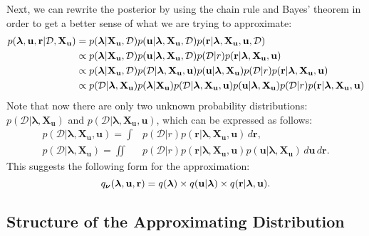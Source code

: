 \documentclass{mprop}
\theoremstyle{definition}
\begin{document}
Next, we can rewrite the posterior by using the chain rule and Bayes' theorem in
order to get a better sense of what we are trying to approximate:
\[
  \begin{split}
    p(\bm\lambda, \mathbf{u}, \mathbf{r} | \mathcal{D}, \mathbf{X_u}) &= p(\bm\lambda | \mathbf{X_u}, \mathcal{D}) p(\mathbf{u}
    | \bm\lambda, \mathbf{X_u}, \mathcal{D}) p(\mathbf{r} | \bm\lambda,
    \mathbf{X_u}, \mathbf{u}, \mathcal{D}) \\
    &\propto p(\bm\lambda | \mathbf{X_u}, \mathcal{D}) p(\mathbf{u} |
    \bm\lambda, \mathbf{X_u}, \mathcal{D}) p(\mathcal{D} | r)
    p(\mathbf{r} | \bm\lambda, \mathbf{X_u}, \mathbf{u}) \\
    &\propto p(\bm\lambda | \mathbf{X_u}, \mathcal{D}) p(\mathcal{D} |
    \bm\lambda, \mathbf{X_u}, \mathbf{u}) p(\mathbf{u} | \bm\lambda,
    \mathbf{X_u}) p(\mathcal{D} | r) p(\mathbf{r} | \bm\lambda,
    \mathbf{X_u}, \mathbf{u}) \\
    &\propto p(\mathcal{D} | \bm\lambda, \mathbf{X_u}) p(\bm\lambda |
    \mathbf{X_u}) p(\mathcal{D} | \bm\lambda, \mathbf{X_u}, \mathbf{u})
    p(\mathbf{u} | \bm\lambda, \mathbf{X_u}) p(\mathcal{D} | r)
    p(\mathbf{r} | \bm\lambda, \mathbf{X_u}, \mathbf{u})
  \end{split}
\]
Note that now there are only two unknown probability distributions:
$p(\mathcal{D} | \bm\lambda, \mathbf{X_u})$ and $p(\mathcal{D} | \bm\lambda,
\mathbf{X_u}, \mathbf{u})$, which can be expressed as follows:
\begin{align*}
  p(\mathcal{D} | \bm\lambda, \mathbf{X_u}, \mathbf{u}) = \int &p(\mathcal{D} | r) p(\mathbf{r} | \bm\lambda, \mathbf{X_u}, \mathbf{u}) \, d\mathbf{r}, \\
  p(\mathcal{D} | \bm\lambda, \mathbf{X_u}) = \iint &p(\mathcal{D} | r) p(\mathbf{r} | \bm\lambda, \mathbf{X_u}, \mathbf{u}) p(\mathbf{u} | \bm\lambda, \mathbf{X_u}) \, d\mathbf{u} \, d\mathbf{r}.
\end{align*}
This suggests the following form for the approximation:
\begin{equation} \label{eq:approximation}
  q_{\bm\nu}(\bm\lambda, \mathbf{u}, \mathbf{r}) = q(\bm\lambda) \times q(\mathbf{u} | \bm\lambda) \times q(\mathbf{r}
  | \bm\lambda, \mathbf{u}).
\end{equation}

\subsection{Structure of the Approximating Distribution} \label{sec:structure}
\end{document}
